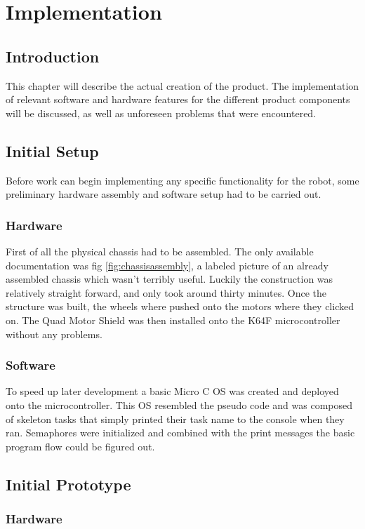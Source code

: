 	\chapter{Implementation}
		\section{Introduction}
		This chapter will describe the actual creation of the product. The implementation of relevant software and hardware features for the different product components will be discussed, as well as unforeseen problems that were encountered.
		
		\section{Initial Setup}
		Before work can begin implementing any specific functionality for the robot, some preliminary hardware assembly and software setup had to be carried out.
			
			\subsection{Hardware}
			First of all the physical chassis had to be assembled. The only available documentation was fig \ref{fig:chassisassembly}, a labeled picture of an already assembled chassis which wasn't terribly useful. Luckily the construction was relatively straight forward, and only took around thirty minutes. Once the structure was built, the wheels where pushed onto the motors where they clicked on. The Quad Motor Shield was then installed onto the K64F microcontroller without any problems.
				
			\subsection{Software}
			To speed up later development a basic Micro C OS was created and deployed onto the microcontroller. This OS resembled the pseudo code and was composed of skeleton tasks that simply printed their task name to the console when they ran. Semaphores were initialized and combined with the print messages the basic program flow could be figured out.
				
		
		\section{Initial Prototype}
			\subsection{Hardware}
			
